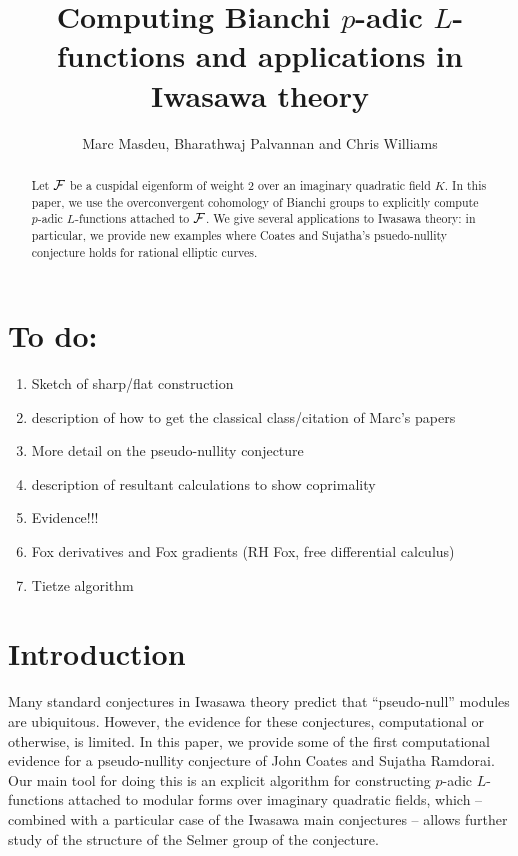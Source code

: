 \documentclass[a4paper,11pt]{article}
\title{Computing Bianchi $p$-adic $L$-functions and applications in Iwasawa theory}
\author{Marc Masdeu, Bharathwaj Palvannan and Chris Williams}
\date{}
\numberwithin{equation}{section}
\begin{document}
%
%

\maketitle


\begin{abstract}
	Let $\mathcal{F}$ be a cuspidal eigenform of weight 2 over an imaginary quadratic field $K$. In this paper, we use the overconvergent cohomology of Bianchi groups to explicitly compute $p$-adic $L$-functions attached to $\mathcal{F}$. We give several applications to Iwasawa theory: in particular, we provide new examples where Coates and Sujatha's psuedo-nullity conjecture holds for rational elliptic curves.%
\end{abstract}

\section*{To do:}

\begin{enumerate}\setlength{\itemsep}{-2pt}
    \item Sketch of sharp/flat construction
    \item description of how to get the classical class/citation of Marc's papers
    \item More detail on the pseudo-nullity conjecture
    \item description of resultant calculations to show coprimality
    \item Evidence!!!
    \item Fox derivatives and Fox gradients (RH Fox, free differential calculus)
    \item Tietze algorithm
\end{enumerate}
\section{Introduction}

Many standard conjectures in Iwasawa theory predict that ``pseudo-null'' modules are ubiquitous. However, the evidence for these conjectures, computational or otherwise, is limited. In this paper, we provide some of the first computational evidence for a pseudo-nullity conjecture of John Coates and Sujatha Ramdorai. Our main tool for doing this is an explicit algorithm for constructing $p$-adic $L$-functions attached to modular forms over imaginary quadratic fields, which -- combined with a particular case of the Iwasawa main conjectures -- allows further study of the structure of the Selmer group of the conjecture.
\end{document}
